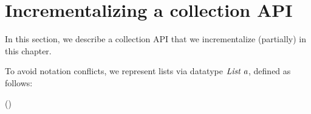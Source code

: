 \section{Incrementalizing a collection API}
\label{sec:incr-coll-api-intro}
In this section, we describe a collection API that we incrementalize (partially)
in this chapter.

To avoid notation conflicts, we represent lists via
datatype \ensuremath{\Conid{List}\;\Varid{a}}, defined as follows:
\begin{hscode}\SaveRestoreHook
{}%
%
\>[B]{}\;\;\mathrel{=}\mid {}\;\;(\;){}\<[E]%
\ColumnHook
\end{hscode}\resethooks

